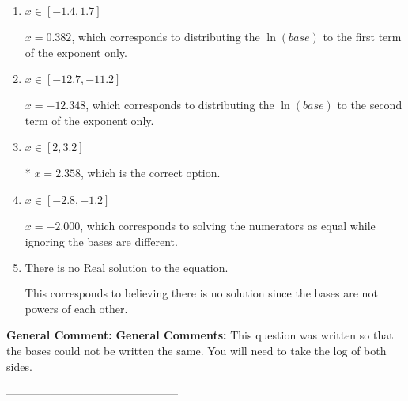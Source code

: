\documentclass{extbook}[14pt]
\begin{document}
\begin{enumerate}[label=\Alph*.] 
\item $ x \in [-1.4, 1.7] $ 

 $x = 0.382$, which corresponds to distributing the $\ln(base)$ to the first term of the exponent only. 
\item $ x \in [-12.7, -11.2] $ 

 $x = -12.348$, which corresponds to distributing the $\ln(base)$ to the second term of the exponent only. 
\item $ x \in [2, 3.2] $ 

 * $x = 2.358$, which is the correct option. 
\item $ x \in [-2.8, -1.2] $ 

 $x = -2.000$, which corresponds to solving the numerators as equal while ignoring the bases are different. 
\item $ \text{There is no Real solution to the equation.} $ 

 This corresponds to believing there is no solution since the bases are not powers of each other. 
\end{enumerate} 
 
\textbf{General Comment:} \textbf{General Comments:} This question was written so that the bases could not be written the same. You will need to take the log of both sides. 

-----------------------------------------------
\end{document}
